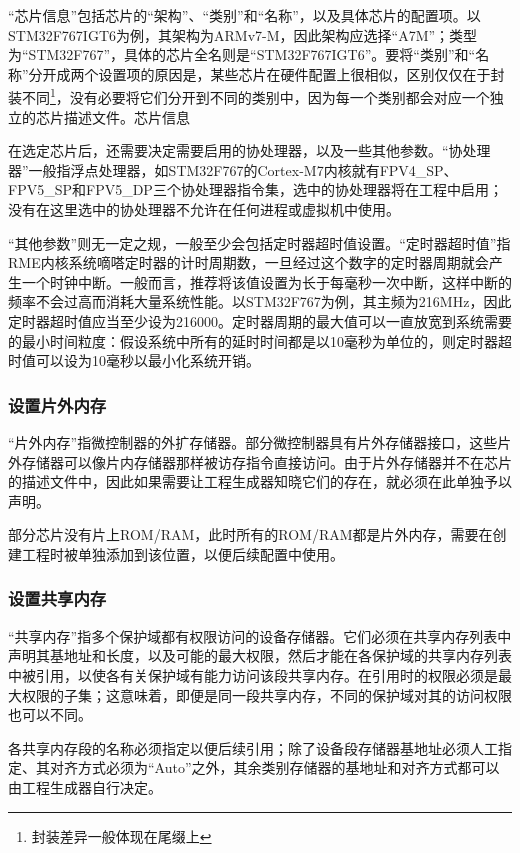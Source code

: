 ``芯片信息''包括芯片的``架构''、``类别''和``名称''，以及具体芯片的配置项。以STM32F767IGT6为例，其架构为ARMv7-M，因此架构应选择``A7M''；类型为``STM32F767''，具体的芯片全名则是``STM32F767IGT6''。要将``类别''和``名称''分开成两个设置项的原因是，某些芯片在硬件配置上很相似，区别仅仅在于封装不同\footnote{封装差异一般体现在尾缀上}，没有必要将它们分开到不同的类别中，因为每一个类别都会对应一个独立的芯片描述文件。芯片信息

在选定芯片后，还需要决定需要启用的协处理器，以及一些其他参数。``协处理器''一般指浮点处理器，如STM32F767的Cortex-M7内核就有FPV4\_SP、FPV5\_SP和FPV5\_DP三个协处理器指令集，选中的协处理器将在工程中启用；没有在这里选中的协处理器不允许在任何进程或虚拟机中使用。

``其他参数''则无一定之规，一般至少会包括定时器超时值设置。``定时器超时值''指RME内核系统嘀嗒定时器的计时周期数，一旦经过这个数字的定时器周期就会产生一个时钟中断。一般而言，推荐将该值设置为长于每毫秒一次中断，这样中断的频率不会过高而消耗大量系统性能。以STM32F767为例，其主频为216MHz，因此定时器超时值应当至少设为216000。定时器周期的最大值可以一直放宽到系统需要的最小时间粒度：假设系统中所有的延时时间都是以10毫秒为单位的，则定时器超时值可以设为10毫秒以最小化系统开销。

\subsubsection{设置片外内存}\label{subsubsec:6-5-1-4}

``片外内存''指微控制器的外扩存储器。部分微控制器具有片外存储器接口，这些片外存储器可以像片内存储器那样被访存指令直接访问。由于片外存储器并不在芯片的描述文件中，因此如果需要让工程生成器知晓它们的存在，就必须在此单独予以声明。

部分芯片没有片上ROM/RAM，此时所有的ROM/RAM都是片外内存，需要在创建工程时被单独添加到该位置，以便后续配置中使用。

\subsubsection{设置共享内存}\label{subsubsec:6-5-1-5}

``共享内存''指多个保护域都有权限访问的设备存储器。它们必须在共享内存列表中声明其基地址和长度，以及可能的最大权限，然后才能在各保护域的共享内存列表中被引用，以使各有关保护域有能力访问该段共享内存。在引用时的权限必须是最大权限的子集；这意味着，即便是同一段共享内存，不同的保护域对其的访问权限也可以不同。

各共享内存段的名称必须指定以便后续引用；除了设备段存储器基地址必须人工指定、其对齐方式必须为``Auto''之外，其余类别存储器的基地址和对齐方式都可以由工程生成器自行决定。


